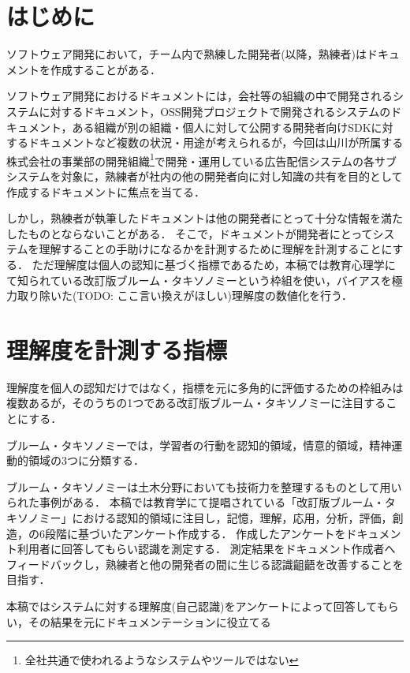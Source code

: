 \section{はじめに}
ソフトウェア開発において，チーム内で熟練した開発者(以降，熟練者)はドキュメントを作成することがある．\cite{bib:ozawa}

ソフトウェア開発におけるドキュメントには，会社等の組織の中で開発されるシステムに対するドキュメント，OSS開発プロジェクトで開発されるシステムのドキュメント，ある組織が別の組織・個人に対して公開する開発者向けSDKに対するドキュメントなど複数の状況・用途が考えられるが，今回は山川が所属する株式会社の事業部の開発組織\footnote{全社共通で使われるようなシステムやツールではない}で開発・運用している広告配信システムの各サブシステムを対象に，熟練者が社内の他の開発者向に対し知識の共有を目的として作成するドキュメントに焦点を当てる．

しかし，熟練者が執筆したドキュメントは他の開発者にとって十分な情報を満たしたものとならないことがある．
そこで，ドキュメントが開発者にとってシステムを理解することの手助けになるかを計測するために理解を計測することにする．
ただ理解度は個人の認知に基づく指標であるため，本稿では教育心理学にて知られている改訂版ブルーム・タキソノミー\cite{bib:nakao}という枠組を使い，バイアスを極力取り除いた(TODO: ここ言い換えがほしい)理解度の数値化を行う．

\section{理解度を計測する指標}
理解度を個人の認知だけではなく，指標を元に多角的に評価するための枠組みは複数あるが，そのうちの1つである改訂版ブルーム・タキソノミーに注目することにする．

ブルーム・タキソノミーでは，学習者の行動を認知的領域，情意的領域，精神運動的領域の3つに分類する．


ブルーム・タキソノミーは土木分野においても技術力を整理するものとして用いられた事例がある．\cite{bib:miyahara}
本稿では教育学にて提唱されている「改訂版ブルーム・タキソノミー」における認知的領域に注目し，記憶，理解，応用，分析，評価，創造，の6段階に基づいたアンケート作成する．
作成したアンケートをドキュメント利用者に回答してもらい認識を測定する．
測定結果をドキュメント作成者へフィードバックし，熟練者と他の開発者の間に生じる認識齟齬を改善することを目指す．

本稿ではシステムに対する理解度(自己認識)をアンケートによって回答してもらい，その結果を元にドキュメンテーションに役立てる




